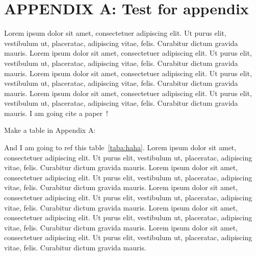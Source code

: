 \newcommand{\hbAppendixPrefix}{A}
\renewcommand{\thefigure}{\hbAppendixPrefix.\arabic{figure}}
\setcounter{figure}{0}
\renewcommand{\thetable}{\hbAppendixPrefix.\arabic{table}} 
\setcounter{table}{0}

\let\svaddcontentsline\addcontentsline
\renewcommand\addcontentsline[3]{%
      \ifthenelse{\equal{#1}{lof}}{}%
        {\ifthenelse{\equal{#1}{lot}}{}{\svaddcontentsline{#1}{#2}{#3}}}}

\section{APPENDIX \hbAppendixPrefix: Test for appendix}

Lorem ipsum dolor sit amet, consectetuer adipiscing elit.  Ut purus elit, vestibulum ut, placeratac,  adipiscing vitae,  felis.   Curabitur dictum gravida mauris.  
Lorem ipsum dolor sit amet, consectetuer adipiscing elit.  Ut purus elit, vestibulum ut, placeratac,  adipiscing vitae,  felis.   Curabitur dictum gravida mauris.  
Lorem ipsum dolor sit amet, consectetuer adipiscing elit.  Ut purus elit, vestibulum ut, placeratac,  adipiscing vitae,  felis.   Curabitur dictum gravida mauris.  
Lorem ipsum dolor sit amet, consectetuer adipiscing elit.  Ut purus elit, vestibulum ut, placeratac,  adipiscing vitae,  felis.   Curabitur dictum gravida mauris.  
I am going cite a paper~\parencite{zuo2018more}!



Make a table in Appendix A:

And I am going to ref this table~\cref{taba:haha}.
Lorem ipsum dolor sit amet, consectetuer adipiscing elit.  Ut purus elit, vestibulum ut, placeratac,  adipiscing vitae,  felis.   Curabitur dictum gravida mauris.  
Lorem ipsum dolor sit amet, consectetuer adipiscing elit.  Ut purus elit, vestibulum ut, placeratac,  adipiscing vitae,  felis.   Curabitur dictum gravida mauris.  
Lorem ipsum dolor sit amet, consectetuer adipiscing elit.  Ut purus elit, vestibulum ut, placeratac,  adipiscing vitae,  felis.   Curabitur dictum gravida mauris.  
Lorem ipsum dolor sit amet, consectetuer adipiscing elit.  Ut purus elit, vestibulum ut, placeratac,  adipiscing vitae,  felis.   Curabitur dictum gravida mauris.  
Lorem ipsum dolor sit amet, consectetuer adipiscing elit.  Ut purus elit, vestibulum ut, placeratac,  adipiscing vitae,  felis.   Curabitur dictum gravida mauris.  
